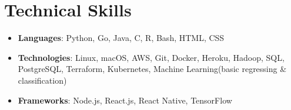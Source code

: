 \documentclass[letterpaper,11pt]{article}
\newcommand{\resumeSubHeadingListStart}{\begin{itemize}[leftmargin=*]}
\newcommand{\resumeSubHeadingListEnd}{\end{itemize}}
\begin{document}
\section{Technical Skills}
  \resumeSubHeadingListStart
    \item{
      \textbf{Languages}{: Python, Go, Java, C, R, Bash, HTML, CSS}
    }
    \item{
      \textbf{Technologies}{: Linux, macOS, AWS, Git, Docker, Heroku, Hadoop, SQL, PostgreSQL, Terraform, Kubernetes, Machine Learning(basic regressing \& classification) }
    }
    \item{
      \textbf{Frameworks}{: Node.js, React.js, React Native, TensorFlow}
    }
  \resumeSubHeadingListEnd

\end{document}
